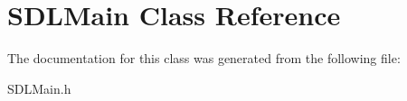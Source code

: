 \hypertarget{interface_s_d_l_main}{
\section{SDLMain Class Reference}
\label{interface_s_d_l_main}
}


The documentation for this class was generated from the following file:\begin{DoxyCompactItemize}
\item 
SDLMain.h\end{DoxyCompactItemize}
